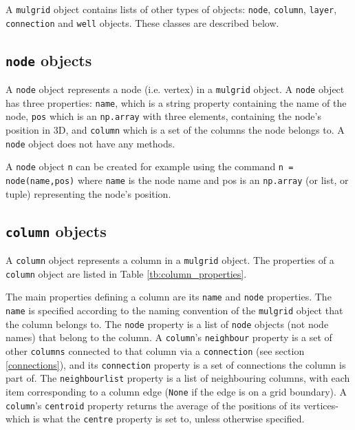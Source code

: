 A \texttt{mulgrid} object contains lists of other types of objects: \texttt{node}, \texttt{column}, \texttt{layer}, \texttt{connection} and \texttt{well} objects.  These classes are described below.

\subsection{\texttt{node} objects}

A \texttt{node} object represents a node (i.e. vertex) in a \texttt{mulgrid} object.  A \texttt{node} object has three properties: \texttt{name}, which is a string property containing the name of the node, \texttt{pos} which is an \texttt{np.array} with three elements, containing the node's position in 3D, and \texttt{column} which is a set of the columns the node belongs to.  A \texttt{node} object does not have any methods.

A \texttt{node} object \texttt{n} can be created for example using the command \texttt{n = node(name,pos)} where \texttt{name} is the node name and pos is an \texttt{np.array} (or list, or tuple) representing the node's position.

\subsection{\texttt{column} objects}
\label{columnobjects}

A \texttt{column} object represents a column in a \texttt{mulgrid} object.  The properties of a \texttt{column} object are listed in Table \ref{tb:column_properties}.

The main properties defining a column are its \texttt{name} and \texttt{node} properties.  The \texttt{name} is specified according to the naming convention of the \texttt{mulgrid} object that the column belongs to.  The \texttt{node} property is a list of \texttt{node} objects (not node names) that belong to the column.  A \texttt{column}'s \texttt{neighbour} property is a set of other \texttt{columns} connected to that column via a \texttt{connection} (see section \ref{connections}), and its \texttt{connection} property is a set of connections the column is part of.  The \texttt{neighbourlist} property is a list of neighbouring columns, with each item corresponding to a column edge (\texttt{None} if the edge is on a grid boundary).  A \texttt{column}'s \texttt{centroid} property returns the average of the positions of its vertices- which is what the \texttt{centre} property is set to, unless otherwise specified.

